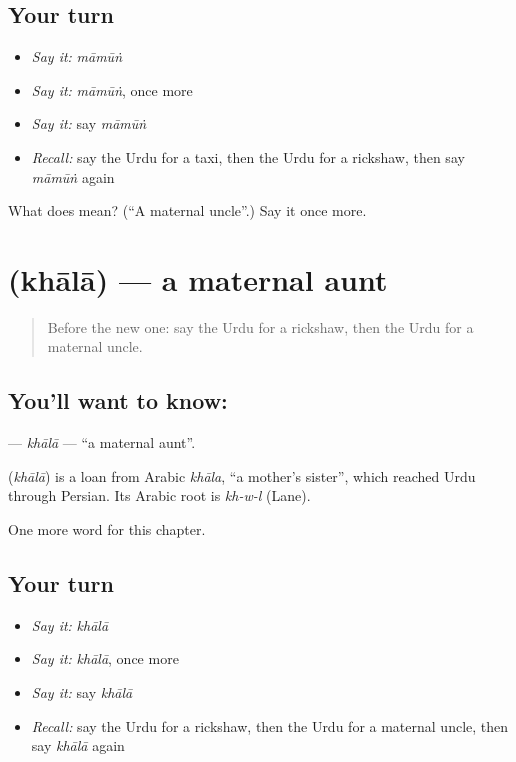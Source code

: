 \subsection*{Your turn}
\begin{itemize}
\raggedright
  \item \emph{Say it:} \emph{māmūṅ}
  \item \emph{Say it:} \emph{māmūṅ}, once more
  \item \emph{Say it:} say \emph{māmūṅ}
  \item \emph{Recall:} say the Urdu for a taxi, then the Urdu for a rickshaw, then say \emph{māmūṅ} again
\end{itemize}

\begin{tcolorbox}[breakable,colback=teal!4,colframe=teal!35!black,title={Before you move on}]
What does  mean? (\textquotedblleft{}A maternal uncle\textquotedblright{}.) Say it once more.
\end{tcolorbox}
\section[\texorpdfstring{\ur{خالہ} (khālā)}{خالہ (khālā)}]{ (khālā) — a maternal aunt}

\label{lesson:UR-C203-khala}



\begin{quote}
Before the new one: say the Urdu for a rickshaw, then the Urdu for a maternal uncle.
\end{quote}

\subsection*{You'll want to know: }
\textbf{} — \emph{khālā} — \textquotedblleft{}a maternal aunt\textquotedblright{}.

\begin{cousinweb}
\textbf{} (\emph{khālā}) is a loan from Arabic \emph{khāla}, \textquotedblleft{}a mother's sister\textquotedblright{}, which reached Urdu through Persian. Its Arabic root is \emph{kh-w-l} (Lane).
\end{cousinweb}

\begin{grammarlens}[title={What you've built}]
One more word for this chapter.
\end{grammarlens}

\subsection*{Your turn}
\begin{itemize}
\raggedright
  \item \emph{Say it:} \emph{khālā}
  \item \emph{Say it:} \emph{khālā}, once more
  \item \emph{Say it:} say \emph{khālā}
  \item \emph{Recall:} say the Urdu for a rickshaw, then the Urdu for a maternal uncle, then say \emph{khālā} again
\end{itemize}

